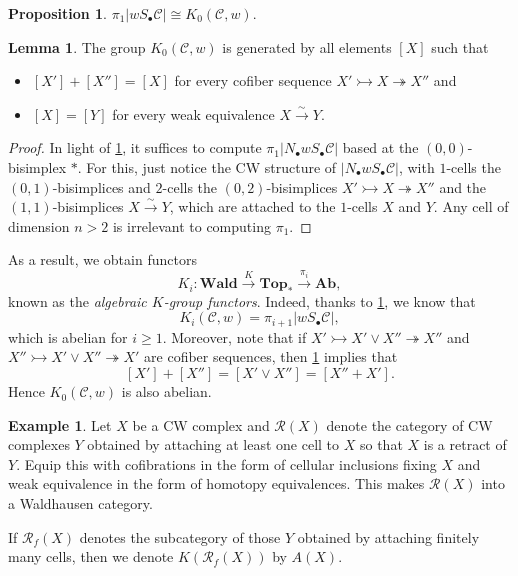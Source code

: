 \documentclass[10pt,letterpaper,cm]{nupset}
\theoremstyle{definition}
\newtheorem{exmp}[definition]{Example}
\theoremstyle{theorem}
\newtheorem{lemma}[definition]{Lemma}
\newtheorem{prop}[definition]{Proposition}
\theoremstyle{remark}
\newcommand{\1}{\mathbf{1}}
\renewcommand{\c}{\mathscr{C}}
\newcommand{\0}{\vec 0}
\begin{document}
\begin{prop}\label{P4}
$\pi_1\left\lvert{w S_{\bullet} \c}\right\rvert \cong K_0(\c, w)$.
\end{prop}

\begin{lemma}\label{L8}
The group $K_0(\c, w)$ is generated by all elements $\left[X\right]$ such that 
\begin{itemize}
\item $\left[X'\right] + \left[X''\right] = \left[X\right]$ for every cofiber sequence $X' \rightarrowtail X \twoheadrightarrow X''$ and
\item  $\left[X\right] = \left[Y\right]$ for every weak equivalence $X \overset{\sim}{\longrightarrow} Y$.
\end{itemize}
\end{lemma}
\begin{proof}
In light of \cref{P4}, it suffices to compute $\pi_1\left\lvert{N_{\bullet}w S_{\bullet} \c}\right\rvert$ based at the $\left(0,0\right)$-bisimplex $\ast$. For this, just notice the CW structure of $\left\lvert{N_{\bullet}w S_{\bullet} \c}\right\rvert$,  with $1$-cells the $\left(0,1\right)$-bisimplices and $2$-cells the $\left(0,2\right)$-bisimplices $X' \rightarrowtail X \twoheadrightarrow X''$ and the $\left(1,1\right)$-bisimplices $X \overset{\sim}{\longrightarrow} Y$, which are attached to the $1$-cells $X$ and $Y$. Any cell of dimension $n>2$ is irrelevant to computing $\pi_1$.
\end{proof}


As a result, we obtain functors $$K_i : \mathbf{Wald} \xrightarrow{K} \mathbf{Top_{\ast}} \xrightarrow{\pi_i} \mathbf{Ab},$$ known as the \textit{algebraic $K$-group functors}. Indeed, thanks to \cref{P4}, we know that $$K_i(\c, w) = \pi_{i+1}\left\lvert{w S_{\bullet} \c}\right\rvert,$$ which is abelian for $i\geq 1$. Moreover, note that if $X' \rightarrowtail X' \vee X'' \twoheadrightarrow X''$ and $X'' \rightarrowtail X' \vee X'' \twoheadrightarrow X'$ are cofiber sequences, then \cref{L8} implies that $$\left[X'\right] + \left[X''\right] = \left[X' \vee X''\right] = \left[X'' + X'\right].$$ Hence $K_0(\c, w)$ is also abelian.


\begin{exmp}
Let $X$ be a CW complex and $\mathcal{R}(X)$ denote the category of CW complexes $Y$  obtained  by attaching at least one cell to $X$ so that $X$ is a retract of $Y$. Equip this with cofibrations in the form of cellular inclusions fixing $X$ and weak equivalence in the form of homotopy equivalences. This makes $\mathcal{R}(X)$ into a Waldhausen category. 

\smallskip
If $\mathcal{R}_f(X)$ denotes the subcategory of those $Y$ obtained by attaching finitely many cells, then we denote  $K(\mathcal{R}_f(X))$ by $A(X)$.
\end{exmp}
\end{document}
